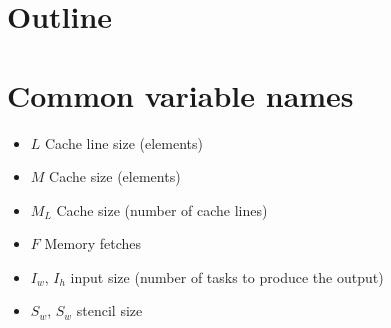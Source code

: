 \section{Outline}

\section{Common variable names}
\begin{itemize}
    \item $L$ Cache line size (elements)
    \item $M$ Cache size (elements)
    \item $M_L$ Cache size (number of cache lines)
    \item $F$ Memory fetches
    \item $I_w$, $I_h$ input size (number of tasks to produce the output)
    \item $S_w$, $S_w$ stencil size
\end{itemize}